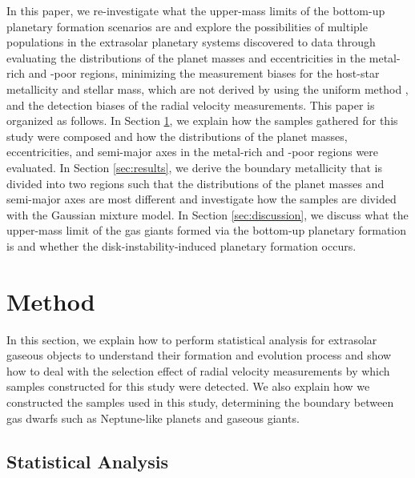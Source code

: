 \documentclass[twocolumn, dvipdfmx]{aastex62}
\begin{document}
\begin{CJK*}{UTF8}{min}
In this paper, we re-investigate what the upper-mass limits of the bottom-up planetary formation scenarios are and explore the possibilities of multiple populations in the extrasolar planetary systems discovered to data through evaluating the distributions of the planet masses and eccentricities in the metal-rich and -poor regions, minimizing the measurement biases for the host-star metallicity and stellar mass, which are not derived by using the uniform method \citep[e.g.,][]{2004A&A...415.1153S, 2008A&A...487..373S}, and the detection biases of the radial velocity measurements. This paper is organized as follows. In Section \ref{sec:method}, we explain how the samples gathered for this study were composed and how the distributions of the planet masses, eccentricities, and semi-major axes in the metal-rich and -poor regions were evaluated. In Section \ref{sec:results}, we derive the boundary metallicity that is divided into two regions such that the distributions of the planet masses and semi-major axes are most different and investigate how the samples are divided with the Gaussian mixture model. In Section \ref{sec:discussion}, we discuss what the upper-mass limit of the gas giants formed via the bottom-up planetary formation is and whether the disk-instability-induced planetary formation occurs.


\section{Method} \label{sec:method}

In this section, we explain how to perform statistical analysis for extrasolar gaseous objects to understand their formation and evolution process and show how to deal with the selection effect of radial velocity measurements by which samples constructed for this study were detected. We also explain how we constructed the samples used in this study, determining the boundary between gas dwarfs such as Neptune-like planets and gaseous giants.


\subsection{Statistical Analysis} \label{subsec:analysis}


\end{CJK*}
\end{document}
